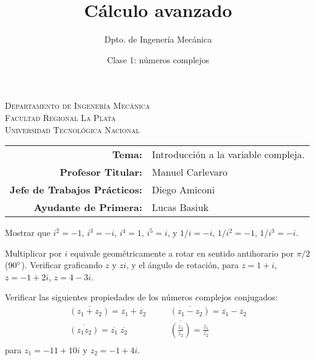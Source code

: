 \documentclass[11pt]{article}
\title{Cálculo avanzado}
\author{Dpto. de Ingenería Mecánica}
\date{Clase 1: números complejos}
\begin{document}

\begin{center}
\end{center} 

\begin{center}
\vspace{\baselineskip}
\Large{\textsc{Departamento de Ingenería Mecánica}} \\
\textsc{Facultad Regional La Plata} \\
\textsc{Universidad Tecnológica Nacional}
\end{center}


\begin{center}
\begin{tabular}{r l}
 \textbf{Tema:} & Introducción a la variable compleja. \\
 \textbf{Profesor Titular:} & Manuel Carlevaro \\
 \textbf{Jefe de Trabajos Prácticos:} & Diego Amiconi \\
 \textbf{Ayudante de Primera:} & Lucas Basiuk 
\end{tabular}\end{center}

\vspace{1em}

\begin{question} %
 Mostrar que $i^2 = -1$, $i^3 = -i$, $i^4 = 1$, $i^5 = i$, y $1/i = -i$, $1/i^2 = -1$, $1/i^3 = -i$.
\end{question}

\begin{question} %
 Multiplicar por $i$ equivale geométricamente a rotar en sentido antihorario por $\pi/2$ ($90\degree$). Verificar graficando $z$ y $zi$, y el ángulo de rotación, para $z = 1 + i$, $z = -1 + 2 i$, $z = 4 - 3 i$.
\end{question}

\begin{question} %
 Verificar las siguientes propiedades de los números complejos conjugados:
 \begin{align*}
  \overline{(z_1 + z_2)} = \overline{z_1} + \overline{z_2} &\qquad \overline{(z_1 - z_2)} = \overline{z_1} - \overline{z_2} \\
  \overline{(z_1 z_2)} = \overline{z_1} \; \overline{z_2} &\qquad \overline{ \left( \frac{z_1}{z_2} \right) } = \frac{\overline{z_1}}{\overline{z_2}} \\
 \end{align*}
 para $z_1 = -11 + 10 i$ y $z_2 = -1 + 4 i$.
\end{question}
\end{document}
